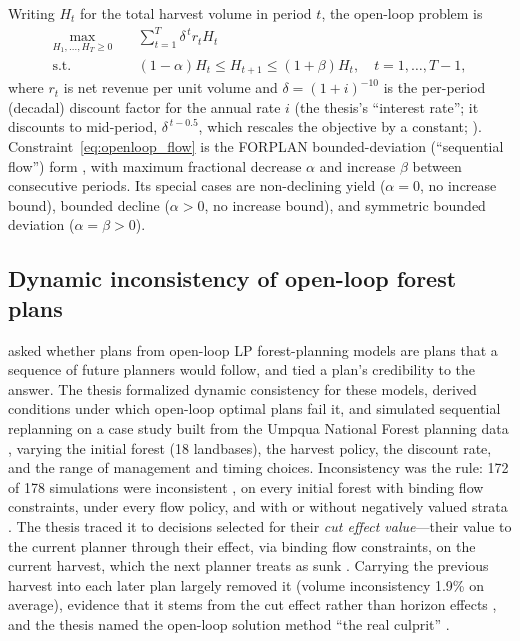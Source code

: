 Writing \(H_t\) for the total harvest volume in period \(t\), the open-loop problem is
\begin{subequations}\label{eq:openloop}
    \begin{align}
        \max_{H_1, \ldots, H_T \geq 0} \quad
            & \sum_{t=1}^{T} \delta^{\,t} r_t H_t
            \label{eq:openloop_obj} \\
        \text{s.t.} \quad
            & (1-\alpha) H_t \leq H_{t+1} \leq (1+\beta) H_t,
            \quad t=1,\ldots,T-1,
            \label{eq:openloop_flow}
    \end{align}
\end{subequations}
where \(r_t\) is net revenue per unit volume and \(\delta = (1+i)^{-10}\) is the per-period (decadal) discount factor for the annual rate $i$ (the thesis's ``interest rate''; it discounts to mid-period, \(\delta^{\,t-0.5}\), which rescales the objective by a constant; \citealp[p.~58]{daugherty1991credibility}). Constraint~\eqref{eq:openloop_flow} is the FORPLAN bounded-deviation (``sequential flow'') form \citep[eq.~3-4, 3-5]{daugherty1991credibility}, with maximum fractional decrease \(\alpha\) and increase \(\beta\) between consecutive periods. Its special cases are non-declining yield (\(\alpha = 0\), no increase bound), bounded decline (\(\alpha > 0\), no increase bound), and symmetric bounded deviation (\(\alpha = \beta > 0\)).

\hypertarget{daughertys-thesis}{%
\subsection{Dynamic inconsistency of open-loop forest plans}\label{daughertys-thesis}}

\citet{daugherty1991credibility} asked whether plans from open-loop LP forest-planning models are plans that a sequence of future planners would follow, and tied a plan's credibility to the answer. The thesis formalized dynamic consistency for these models, derived conditions under which open-loop optimal plans fail it, and simulated sequential replanning on a case study built from the Umpqua National Forest planning data \citep{usda1987umpqua}, varying the initial forest (18 landbases), the harvest policy, the discount rate, and the range of management and timing choices. Inconsistency was the rule: 172 of 178 simulations were inconsistent \citep[p.~92]{daugherty1991credibility}, on every initial forest with binding flow constraints, under every flow policy, and with or without negatively valued strata \citep[pp.~92, 122]{daugherty1991credibility}. The thesis traced it to decisions selected for their \emph{cut effect value}---their value to the current planner through their effect, via binding flow constraints, on the current harvest, which the next planner treats as sunk \citep[p.~41]{daugherty1991credibility}. Carrying the previous harvest into each later plan largely removed it (volume inconsistency 1.9\% on average), evidence that it stems from the cut effect rather than horizon effects \citep[pp.~120, 123]{daugherty1991credibility}, and the thesis named the open-loop solution method ``the real culprit'' \citep[p.~136]{daugherty1991credibility}.
